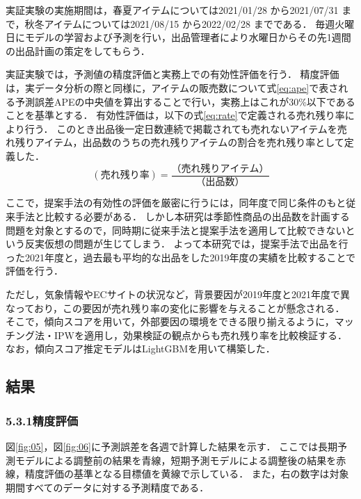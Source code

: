 \documentclass[dvipdfmx]{jreport}
\begin{document}
実証実験の実施期間は，春夏アイテムについては2021/01/28 から2021/07/31 まで，秋冬アイテムについては2021/08/15 から2022/02/28 までである．
毎週火曜日にモデルの学習および予測を行い，出品管理者により水曜日からその先1週間の出品計画の策定をしてもらう．

実証実験では，予測値の精度評価と実務上での有効性評価を行う．
精度評価は，実データ分析の際と同様に，アイテムの販売数について式\eqref{eq:ape}で表される予測誤差APEの中央値を算出することで行い，実務上はこれが30\%以下であることを基準とする．
有効性評価は，以下の式\eqref{eq:rate}で定義される売れ残り率により行う．
このとき出品後一定日数連続で掲載されても売れないアイテムを売れ残りアイテム，出品数のうちの売れ残りアイテムの割合を売れ残り率として定義した．
\begin{equation}
    (売れ残り率) = \frac{（売れ残りアイテム）}{（出品数）}
    \label{eq:rate}
\end{equation}

ここで，提案手法の有効性の評価を厳密に行うには，同年度で同じ条件のもと従来手法と比較する必要がある．
しかし本研究は季節性商品の出品数を計画する問題を対象とするので，同時期に従来手法と提案手法を適用して比較できないという反実仮想の問題が生じてしまう．
よって本研究では，提案手法で出品を行った2021年度と，過去最も平均的な出品をした2019年度の実績を比較することで評価を行う．%

ただし，気象情報やECサイトの状況など，背景要因が2019年度と2021年度で異なっており，この要因が売れ残り率の変化に影響を与えることが懸念される．
そこで，傾向スコアを用いて，外部要因の環境をできる限り揃えるように，マッチング法・IPWを適用し，効果検証の観点からも売れ残り率を比較検証する．
なお，傾向スコア推定モデルはLightGBMを用いて構築した．

\subsection{結果}
\subsubsection{5.3.1\hspace{10pt}精度評価}
図\ref{fig:05}，図\ref{fig:06}に予測誤差を各週で計算した結果を示す．
ここでは長期予測モデルによる調整前の結果を青線，短期予測モデルによる調整後の結果を赤線，精度評価の基準となる目標値を黄線で示している．
また，右の数字は対象期間すべてのデータに対する予測精度である．
\end{document}

